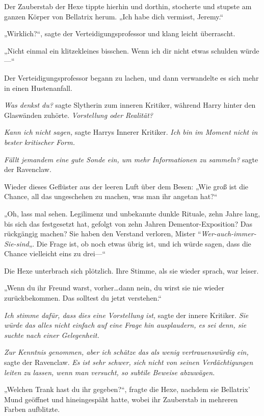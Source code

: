 {Der Zauberstab der Hexe tippte hierhin und dorthin, stocherte und stupste am ganzen Körper von Bellatrix herum. „Ich habe dich vermisst, Jeremy.“

„Wirklich?“, sagte der Verteidigungsprofessor und klang leicht überrascht.

„Nicht einmal ein klitzekleines bisschen. Wenn ich dir nicht etwas schulden würde—“

Der Verteidigungsprofessor begann zu lachen, und dann verwandelte es sich mehr in einen Hustenanfall.

\emph{Was denkst du?} sagte Slytherin zum inneren Kritiker, während Harry hinter den Glaswänden zuhörte. \emph{Vorstellung oder Realität?}

\emph{Kann ich nicht sagen,} sagte Harrys Innerer Kritiker. \emph{Ich bin im Moment nicht in bester kritischer Form.}

\emph{Fällt jemandem eine gute Sonde ein, um mehr Informationen zu sammeln?} sagte der Ravenclaw.

Wieder dieses Geflüster aus der leeren Luft über dem Besen: „Wie groß ist die Chance, all das ungeschehen zu machen, was man ihr angetan hat?“

„Oh, lass mal sehen. Legilimenz und unbekannte dunkle Rituale, zehn Jahre lang, bis sich das festgesetzt hat, gefolgt von zehn Jahren Dementor-Exposition? Das rückgängig machen? Sie haben den Verstand verloren, Mister “\emph{Wer-auch-immer-Sie-sind}„. Die Frage ist, ob noch etwas übrig ist, und ich würde sagen, dass die Chance vielleicht eins zu drei—“

Die Hexe unterbrach sich plötzlich. Ihre Stimme, als sie wieder sprach, war leiser.

„Wenn du ihr Freund warst, vorher…dann nein, du wirst sie nie wieder zurückbekommen. Das solltest du jetzt verstehen.“

\emph{Ich stimme dafür, dass dies eine Vorstellung ist,} sagte der innere Kritiker. \emph{Sie würde das alles nicht einfach auf eine Frage hin ausplaudern, es sei denn, sie suchte nach einer Gelegenheit.}

\emph{Zur Kenntnis genommen, aber ich schätze das als wenig vertrauenswürdig ein,} sagte der Ravenclaw. \emph{Es ist sehr schwer, sich nicht von seinen Verdächtigungen leiten zu lassen, wenn man versucht, so subtile Beweise abzuwägen.}

„Welchen Trank hast du ihr gegeben?“, fragte die Hexe, nachdem sie Bellatrix' Mund geöffnet und hineingespäht hatte, wobei ihr Zauberstab in mehreren Farben aufblitzte.

}
